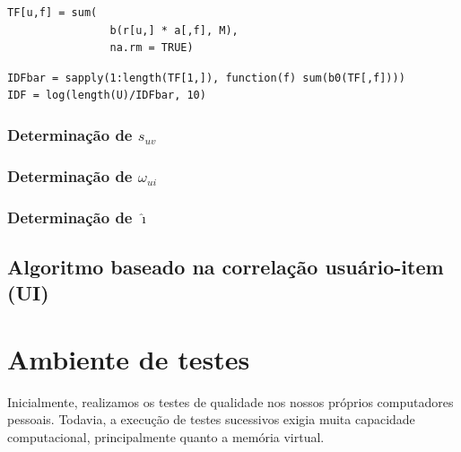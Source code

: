\begin{lstlisting}[caption=Determinação de $\mathrm{TF}_{uf}$,label=lst:tf]
TF[u,f] = sum(
        		b(r[u,] * a[,f], M),
        		na.rm = TRUE)
\end{lstlisting}


\begin{lstlisting}[caption=Determinação de $\mathrm{IDF}_{f}$,label=lst:idf]
IDFbar = sapply(1:length(TF[1,]), function(f) sum(b0(TF[,f])))
IDF = log(length(U)/IDFbar, 10)
\end{lstlisting}

\subsubsection{Determinação de $s_{uv}$} %
\label{ssub:determina_o_de_}


\subsubsection{Determinação de $\omega_{ui}$} %
\label{ssub:determina_o_de_}

\subsubsection{Determinação de $\hat{\imath}$} %
\label{ssub:determina_o_de_}

\subsection{Algoritmo baseado na correlação usuário-item (UI)} %
\label{sub:algoritmo_baseado_na_correla_o_usu_rio_item_ui_}




\section{Ambiente de testes} %
\label{sec:ambiente_de_testes}

Inicialmente, realizamos os testes de qualidade nos nossos próprios computadores pessoais. Todavia, a execução de testes sucessivos exigia muita capacidade computacional, principalmente quanto a memória virtual.

